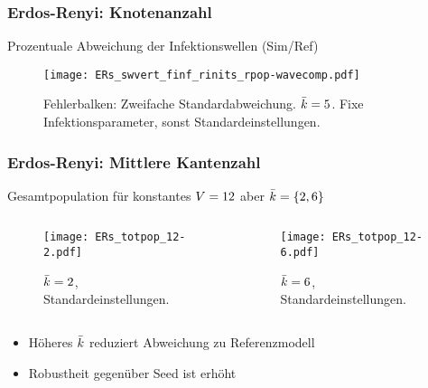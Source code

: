 \begin{frame}[t]
    \frametitle{Erdos-Renyi: Knotenanzahl}
    Prozentuale Abweichung der Infektionswellen (Sim/Ref)
    \begin{figure}[htpb]
        \centering
        \texttt{[image: ERs\_swvert\_finf\_rinits\_rpop-wavecomp.pdf]}
        \caption{Fehlerbalken: Zweifache Standardabweichung. $\bar{k} = 5$. Fixe Infektionsparameter, sonst Standardeinstellungen.}%
        \label{fig:ERs_swvert_finf_rinits_rpop-wavecomp}
    \end{figure}


\end{frame}
\begin{frame}[t]
    \frametitle{Erdos-Renyi: Mittlere Kantenzahl}
    Gesamtpopulation für konstantes $V = 12$ aber $\bar{k} = \{2, 6\}$
    \begin{columns}
        \begin{column}{0.5\textwidth}
            \begin{figure}[htpb]
                \centering
                \texttt{[image: ERs\_totpop\_12-2.pdf]}
                \caption{$\bar{k} = 2$, Standardeinstellungen.}
                \label{fig:ERs_totpop_12-2}
            \end{figure}
        \end{column}
        \begin{column}{0.5\textwidth}
            \begin{figure}[htpb]
                \centering
                \texttt{[image: ERs\_totpop\_12-6.pdf]}
                \caption{$\bar{k} = 6$, Standardeinstellungen.}
                \label{fig:ERs_totpop_12-6}
            \end{figure}
        \end{column}
    \end{columns}
    \begin{itemize}
        \item Höheres $\bar{k}$ reduziert Abweichung zu Referenzmodell
        \item Robustheit gegenüber Seed ist erhöht
    \end{itemize}
\end{frame}

